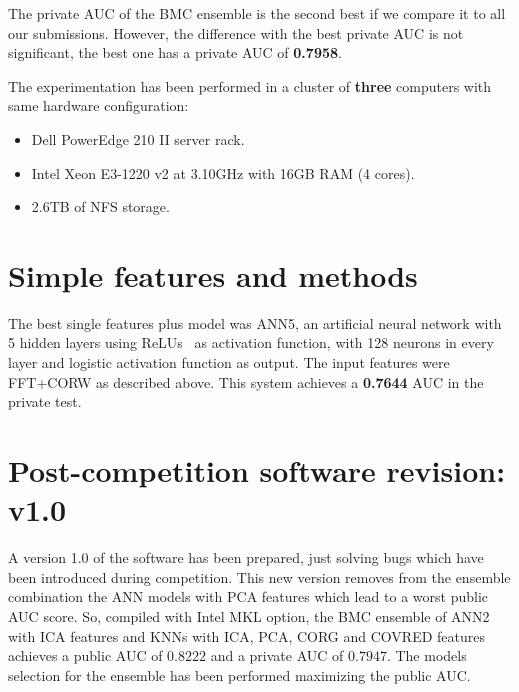 \documentclass[a4paper,english,twoside]{article}
\begin{document}
The private AUC of the BMC ensemble is the second best if we compare it
to all our submissions. However, the difference with the best private
AUC is not significant, the best one has a private AUC of
\textbf{0.7958}.

The experimentation has been performed in a cluster of \textbf{three}
computers with same hardware configuration:

\begin{itemize}
\item
  Dell PowerEdge 210 II server rack.
\item
  Intel Xeon E3-1220 v2 at 3.10GHz with 16GB RAM (4 cores).
\item
  2.6TB of NFS storage.
\end{itemize}

\section{Simple features and methods}\label{simple-features-and-methods}

The best single features plus model was ANN5, an artificial neural
network with 5 hidden layers using ReLUs~\cite{2011:glorot:aistats}
as activation function, with 128 neurons in every layer and logistic
activation function as output. The input features were FFT+CORW as
described above. This system achieves a \textbf{0.7644} AUC in the
private test.

\section*{Post-competition software revision: v1.0}

A version 1.0 of the software has been prepared, just solving bugs which have
been introduced during competition. This new version removes from the ensemble
combination the ANN models with PCA features which lead to a worst public AUC
score. So, compiled with Intel MKL option, the BMC ensemble of ANN2 with ICA
features and KNNs with ICA, PCA, CORG and COVRED features achieves a public AUC
of $\mathbf{0.8222}$ and a private AUC of $\mathbf{0.7947}$. The models
selection for the ensemble has been performed maximizing the public AUC.



\end{document}
